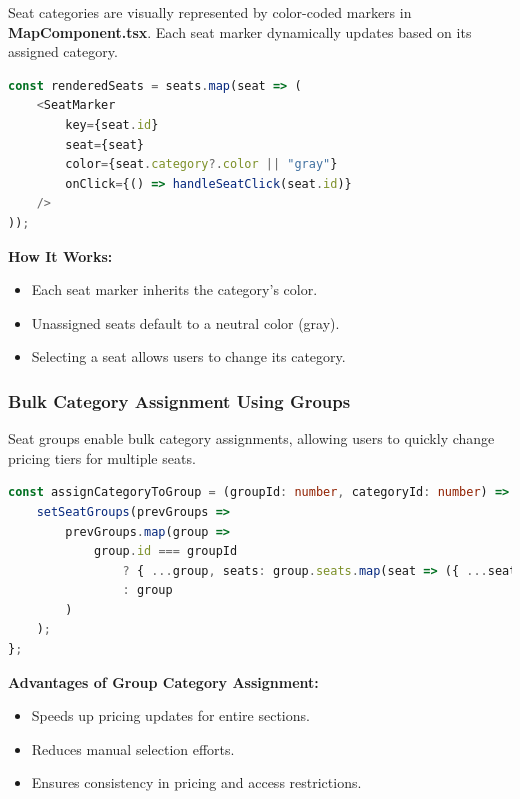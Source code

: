Seat categories are visually represented by color-coded markers in \textbf{MapComponent.tsx}. Each seat marker dynamically updates based on its assigned category.

\begin{lstlisting}[language=TypeScript, caption=Rendering Seat Markers with Categories, label=lst:render-seat-category]
const renderedSeats = seats.map(seat => (
    <SeatMarker 
        key={seat.id} 
        seat={seat} 
        color={seat.category?.color || "gray"} 
        onClick={() => handleSeatClick(seat.id)}
    />
));
\end{lstlisting}

\textbf{How It Works:}
\begin{itemize}
    \item Each seat marker inherits the category's color.
    \item Unassigned seats default to a neutral color (gray).
    \item Selecting a seat allows users to change its category.
\end{itemize}

\subsubsection{Bulk Category Assignment Using Groups}

Seat groups enable bulk category assignments, allowing users to quickly change pricing tiers for multiple seats.

\begin{lstlisting}[language=TypeScript, caption=Assigning Categories to Seat Groups, label=lst:group-category-assignment]
const assignCategoryToGroup = (groupId: number, categoryId: number) => {
    setSeatGroups(prevGroups => 
        prevGroups.map(group => 
            group.id === groupId 
                ? { ...group, seats: group.seats.map(seat => ({ ...seat, category: context.categories.find(c => c.id === categoryId) })) }
                : group
        )
    );
};
\end{lstlisting}

\textbf{Advantages of Group Category Assignment:}
\begin{itemize}
    \item Speeds up pricing updates for entire sections.
    \item Reduces manual selection efforts.
    \item Ensures consistency in pricing and access restrictions.
\end{itemize}

